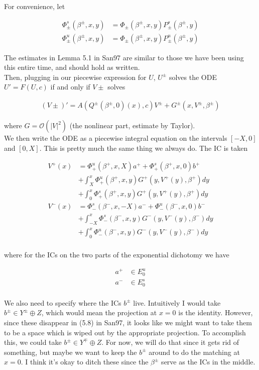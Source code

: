 \documentclass[12pt]{article}
\begin{document}
For convenience, let

\begin{align*}
\Phi^s_\pm(\beta^\pm, x, y) &= \Phi_\pm(\beta^\pm, x, y) P^s_\pm(\beta^\pm, y) \\
\Phi^u_\pm(\beta^\pm, x, y) &= \Phi_\pm(\beta^\pm, x, y) P^u_\pm(\beta^\pm, y) 
\end{align*}

The estimates in Lemma 5.1 in San97 are similar to those we have been using this entire time, and should hold as written.\\

Then, plugging in our piecewise expression for $U$, $U^\pm$ solves the ODE $U' = F(U, c)$ if and only if $V\pm$ solves

\begin{align*}
(V\pm)' = A(Q^\pm(\beta^\pm, 0)(x), c)V^\pm + G^\pm(x, V^\pm, \beta^\pm) 
\end{align*}

where $G = \mathcal{O}(|V|^2)$ (the nonlinear part, estimate by Taylor).\\

We then write the ODE as a piecewise integral equation on the intervals $[-X, 0]$ and $[0, X]$. This is pretty much the same thing we always do. The IC is taken 

\begin{align*}
V^+(x) &= \Phi^u_+(\beta^+, x, X) a^+ + \Phi^s_+(\beta^+, x, 0) b^+ \\
&+ \int_{X}^x \Phi_+^u(\beta^+, x, y) G^+(y, V^+(y),\beta^+)dy \\
&+ \int_0^x \Phi_+^s(\beta^+, x, y) G^+(y, V^+(y),\beta^+)dy \\ 
V^-(x) &= \Phi^s_-(\beta^-, x, -X) a^- + \Phi^u_-(\beta^-, x, 0) b^- \\
&+ \int_{-X}^x \Phi_-^s(\beta^-, x, y) G^-(y, V^-(y),\beta^-)dy \\
&+ \int_0^x \Phi_-^u(\beta^-, x, y) G^-(y, V^-(y),\beta^-)dy \\
\end{align*}

where for the ICs on the two parts of the exponential dichotomy we have

\begin{align*}
a^+ &\in E_0^u \\
a^- &\in E_0^s \\
\end{align*}

We also need to specify where the ICs $b^\pm$ live. Intuitively I would take $b^\pm \in Y^\pm \oplus Z$, which would mean the projection at $x = 0$ is the identity. However, since these disappear in (5.8) in San97, it looks like we might want to take them to be a space which is wiped out by the appropriate projection. To accomplish this, we could take $b^\pm \in Y^\mp \oplus Z$. For now, we will do that since it gets rid of something, but maybe we want to keep the $b^\pm$ around to do the matching at $x = 0$. I think it's okay to ditch these since the $\beta^\pm$ serve as the ICs in the middle. \\
\end{document}
